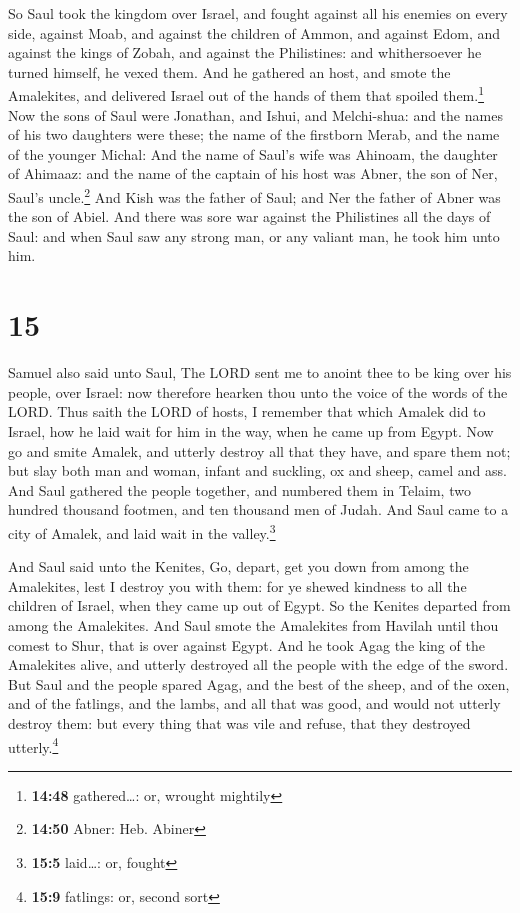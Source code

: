  So Saul took the kingdom over Israel, and fought against
all his enemies on every side, against Moab, and against the children of
Ammon, and against Edom, and against the kings of Zobah, and against the
Philistines: and whithersoever he turned himself, he vexed them.
 And he gathered an host, and smote the Amalekites, and
delivered Israel out of the hands of them that spoiled them.\footnote{\textbf{14:48}
  gathered\ldots: or, wrought mightily}  Now the sons of
Saul were Jonathan, and Ishui, and Melchi-shua: and the names of his two
daughters were these; the name of the firstborn Merab, and the name of
the younger Michal:  And the name of Saul's wife was
Ahinoam, the daughter of Ahimaaz: and the name of the captain of his
host was Abner, the son of Ner, Saul's uncle.\footnote{\textbf{14:50}
  Abner: Heb. Abiner}  And Kish was the father of Saul;
and Ner the father of Abner was the son of Abiel.  And
there was sore war against the Philistines all the days of Saul: and
when Saul saw any strong man, or any valiant man, he took him unto him.

\hypertarget{section-14}{%
\section{15}\label{section-14}}

 Samuel also said unto Saul, The LORD sent me to anoint
thee to be king over his people, over Israel: now therefore hearken thou
unto the voice of the words of the LORD.  Thus saith the
LORD of hosts, I remember that which Amalek did to Israel, how he laid
wait for him in the way, when he came up from Egypt.  Now
go and smite Amalek, and utterly destroy all that they have, and spare
them not; but slay both man and woman, infant and suckling, ox and
sheep, camel and ass.  And Saul gathered the people
together, and numbered them in Telaim, two hundred thousand footmen, and
ten thousand men of Judah.  And Saul came to a city of
Amalek, and laid wait in the valley.\footnote{\textbf{15:5} laid\ldots:
  or, fought}

 And Saul said unto the Kenites, Go, depart, get you down
from among the Amalekites, lest I destroy you with them: for ye shewed
kindness to all the children of Israel, when they came up out of Egypt.
So the Kenites departed from among the Amalekites.  And
Saul smote the Amalekites from Havilah until thou comest to Shur, that
is over against Egypt.  And he took Agag the king of the
Amalekites alive, and utterly destroyed all the people with the edge of
the sword.  But Saul and the people spared Agag, and the
best of the sheep, and of the oxen, and of the fatlings, and the lambs,
and all that was good, and would not utterly destroy them: but every
thing that was vile and refuse, that they destroyed utterly.\footnote{\textbf{15:9}
  fatlings: or, second sort}

